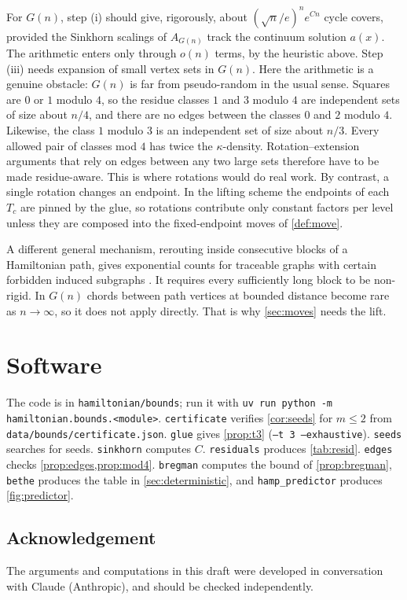 \documentclass[11pt]{amsart}
\theoremstyle{definition}
\begin{document}
For $G(n)$, step (i) should give, rigorously, about $(\sqrt n/e)^n e^{Cn}$ cycle
covers, provided the Sinkhorn scalings of $A_{G(n)}$ track the continuum solution $a(x)$.
The arithmetic enters only through $o(n)$ terms, by the heuristic above. Step (iii)
needs expansion of small vertex sets in $G(n)$. Here the arithmetic is a genuine obstacle: $G(n)$ is far from
pseudo-random in the usual sense. Squares are $0$ or $1$ modulo $4$, so the residue
classes $1$ and $3$ modulo $4$ are independent sets of size about $n/4$, and there are no
edges between the classes $0$ and $2$ modulo $4$. Likewise, the class $1$ modulo $3$ is
an independent set of size about $n/3$. Every allowed pair of classes mod $4$ has twice the
$\kappa$-density. Rotation--extension arguments that rely on edges between any two
large sets therefore have to be made residue-aware. This is where rotations would do
real work.
By contrast, a single rotation changes an endpoint. In the lifting scheme the
endpoints of each $T_c$ are pinned by the glue, so rotations contribute only constant
factors per level unless they are composed into the fixed-endpoint moves of
\cref{def:move}.

A different general mechanism, rerouting inside consecutive blocks of a
Hamiltonian path, gives exponential counts for traceable graphs with certain forbidden
induced subgraphs \cite{JookenZamfirescu}. It requires every sufficiently long block
to be non-rigid. In $G(n)$ chords between path vertices at bounded distance become rare
as $n\to\infty$, so it does not apply directly. That is why \cref{sec:moves} needs
the lift.



\section{Software}\sloppy
The code is in \texttt{hamiltonian/bounds}; run it with
\texttt{uv run python -m hamiltonian.bounds.<module>}.
\texttt{certificate} verifies \cref{cor:seeds} for $m\le2$ from
\texttt{data/bounds/certificate.json}. \texttt{glue} gives \cref{prop:t3}
(\texttt{--t 3 --exhaustive}). \texttt{seeds} searches for seeds. \texttt{sinkhorn}
computes $C$. \texttt{residuals} produces \cref{tab:resid}. \texttt{edges} checks
\cref{prop:edges,prop:mod4}. \texttt{bregman} computes the bound of \cref{prop:bregman},
\texttt{bethe} produces the table in \cref{sec:deterministic}, and \texttt{hamp\_predictor}
produces \cref{fig:predictor}.

\subsection*{Acknowledgement}
The arguments and computations in this draft were developed in conversation with
Claude (Anthropic), and should be checked independently.

\appendix




\end{document}
